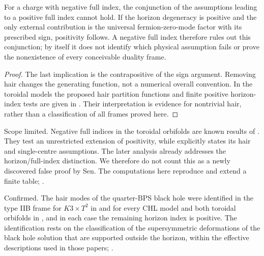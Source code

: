 \begin{proposition}\label{prop:hypothesis}
For a charge with negative full index, the conjunction of the assumptions leading to a positive full index cannot hold. If the horizon degeneracy is positive and the only external contribution is the universal fermion-zero-mode factor with its prescribed sign, positivity follows. A negative full index therefore rules out this conjunction; by itself it does not identify which physical assumption fails or prove the nonexistence of every conceivable duality frame.
\end{proposition}
\begin{proof}
The last implication is the contrapositive of the sign argument. Removing hair changes the generating function, not a numerical overall convention. In the toroidal models the proposed hair partition functions and finite positive horizon-index tests are given in \cite{CD21}. Their interpretation is evidence for nontrivial hair, rather than a classification of all frames proved here.
\end{proof}

\begin{verdict}
Scope limited. Negative full indices in the toroidal orbifolds are known results of \cite{CD19}. They test an unrestricted extension of positivity, while \cite{Sen11positivity} explicitly states its hair and single-centre assumptions. The later analysis \cite{CD21} already addresses the horizon/full-index distinction. We therefore do not count this as a newly discovered false proof by Sen. The computations here reproduce and extend a finite table; .
\end{verdict}

\begin{verdict}[claim 10]
Confirmed. The hair modes of the quarter-BPS black hole were identified in the type IIB frame for $K3\times T^2$ in \cite{BMS09hair} and for every CHL model and both toroidal orbifolds in \cite{CD21}, and in each case the remaining horizon index is positive. The identification rests on the classification of the supersymmetric deformations of the black hole solution that are supported outside the horizon, within the effective descriptions used in those papers; .
\end{verdict}

